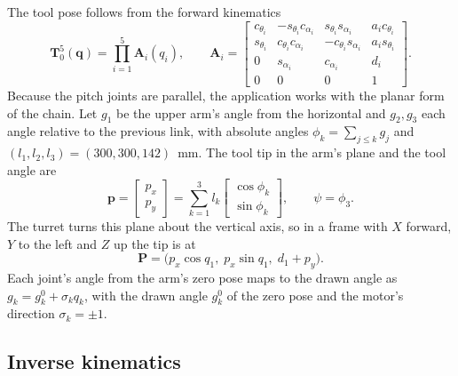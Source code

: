 \documentclass[11pt,a4paper]{article}
\begin{document}
The tool pose follows from the forward kinematics
\begin{equation}
  \mathbf T_0^5(\mathbf q)=\prod_{i=1}^{5}\mathbf A_i(q_i),\qquad
  \mathbf A_i=\begin{bmatrix}
    c_{\theta_i} & -s_{\theta_i}c_{\alpha_i} & s_{\theta_i}s_{\alpha_i} & a_i c_{\theta_i}\\
    s_{\theta_i} & c_{\theta_i}c_{\alpha_i} & -c_{\theta_i}s_{\alpha_i} & a_i s_{\theta_i}\\
    0 & s_{\alpha_i} & c_{\alpha_i} & d_i\\
    0&0&0&1\end{bmatrix}.
\end{equation}
Because the pitch joints are parallel, the application works with the planar form of the chain. Let $g_1$ be
the upper arm's angle from the horizontal and $g_2,g_3$ each angle relative to the previous link, with
absolute angles $\phi_k=\sum_{j\le k}g_j$ and $(l_1,l_2,l_3)=(300,300,142)$~mm. The tool tip in the arm's plane
and the tool angle are
\begin{equation}
  \mathbf p=\begin{bmatrix}p_x\\ p_y\end{bmatrix}=\sum_{k=1}^{3} l_k\begin{bmatrix}\cos\phi_k\\ \sin\phi_k\end{bmatrix},
  \qquad \psi=\phi_3 .
\end{equation}
The turret turns this plane about the vertical axis, so in a frame with $X$ forward, $Y$ to the left and $Z$ up
the tip is at
\begin{equation}
  \mathbf P=\bigl(p_x\cos q_1,\; p_x\sin q_1,\; d_1+p_y\bigr).
\end{equation}
Each joint's angle from the arm's zero pose maps to the drawn angle as $g_k=g_k^{0}+\sigma_k q_k$, with the
drawn angle $g_k^0$ of the zero pose and the motor's direction $\sigma_k=\pm1$.

\subsection{Inverse kinematics}
\end{document}
